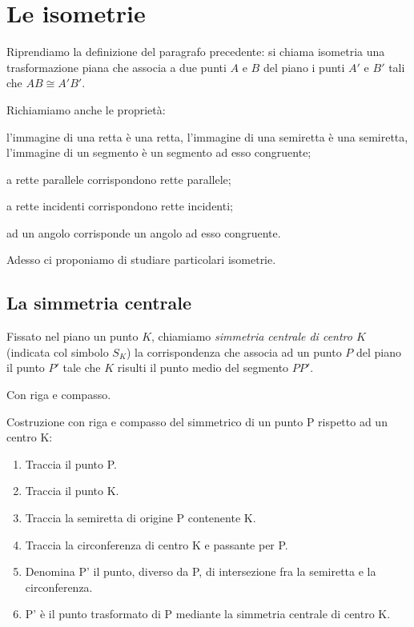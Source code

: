 \section{Le isometrie}
\label{sect:isometrie}

Riprendiamo la definizione del paragrafo precedente: si chiama 
isometria una trasformazione piana che associa a due punti $A$ e $B$ 
del piano i punti $A'$ e $B'$ tali che $AB\cong A'B'$.

Richiamiamo anche le proprietà:
\begin{itemize*}
\item l'immagine di una retta è una retta, l'immagine di una 
semiretta è una semiretta, l'immagine di un segmento è un segmento ad 
esso congruente;
\item a rette parallele corrispondono rette parallele;
\item a rette incidenti corrispondono rette incidenti;
\item ad un angolo corrisponde un angolo ad esso congruente.
\end{itemize*}

Adesso ci proponiamo di studiare particolari isometrie.


\subsection{La simmetria centrale}

\begin{definizione}
Fissato nel piano un punto $K$, chiamiamo \emph{simmetria centrale di 
centro $K$} (indicata col simbolo $S_K$) la  corrispondenza che 
associa ad un punto $P$ del piano il punto $P'$ tale che $K$ risulti 
il punto medio del segmento $PP'$.
\end{definizione}

Con riga e compasso.

\begin{procedura}
  Costruzione con riga e compasso del simmetrico di un punto P rispetto ad un 
centro K:
  \begin{enumerate} [nosep]
    \item 
    Traccia il punto P.
    \item 
    Traccia il punto K.
    \item 
    Traccia la semiretta di origine P contenente K.
    \item 
    Traccia la circonferenza di centro K e passante per P. 
    \item 
    Denomina P' il punto, diverso da P, di intersezione fra la semiretta e la 
circonferenza.  
    \item 
    P' è il punto trasformato di P mediante la simmetria centrale di centro K.
  \end{enumerate}
\end{procedura}

